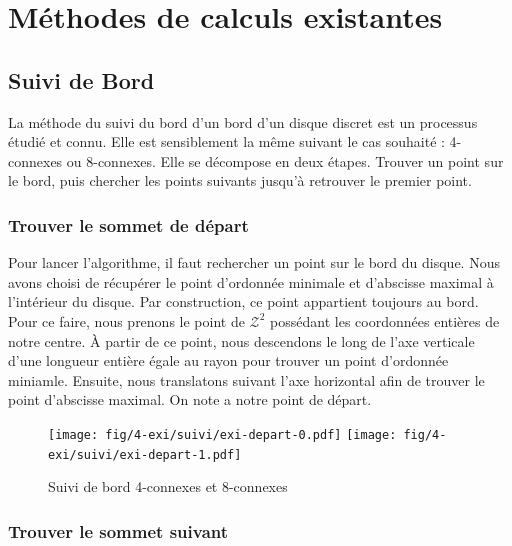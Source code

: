 \section{Méthodes de calculs existantes}

\subsection{Suivi de Bord}

La méthode du suivi du bord d'un bord d'un disque discret est un processus étudié et connu. Elle est sensiblement la même suivant le cas souhaité : 4-connexes ou 8-connexes. Elle se décompose en deux étapes. Trouver un point sur le bord, puis chercher les points suivants jusqu'à retrouver le premier point.

\subsubsection{Trouver le sommet de départ}

Pour lancer l'algorithme, il faut rechercher un point sur le bord du disque. Nous avons choisi de récupérer le point d'ordonnée minimale et d'abscisse maximal à l'intérieur du disque. Par construction, ce point appartient toujours au bord. Pour ce faire, nous prenons le point de $\mathcal{Z}^2$ possédant les coordonnées entières de notre centre. À partir de ce point, nous descendons le long de l'axe verticale d'une longueur entière égale au rayon pour trouver un point d'ordonnée miniamle. Ensuite, nous translatons suivant l'axe horizontal afin de trouver le point d'abscisse maximal. On note a notre point de départ. 

\begin{figure}[H]
  \centering
  \texttt{[image: fig/4-exi/suivi/exi-depart-0.pdf]}
  \texttt{[image: fig/4-exi/suivi/exi-depart-1.pdf]}
  \caption{Suivi de bord 4-connexes et 8-connexes}
\end{figure}
  

\subsubsection{Trouver le sommet suivant}

